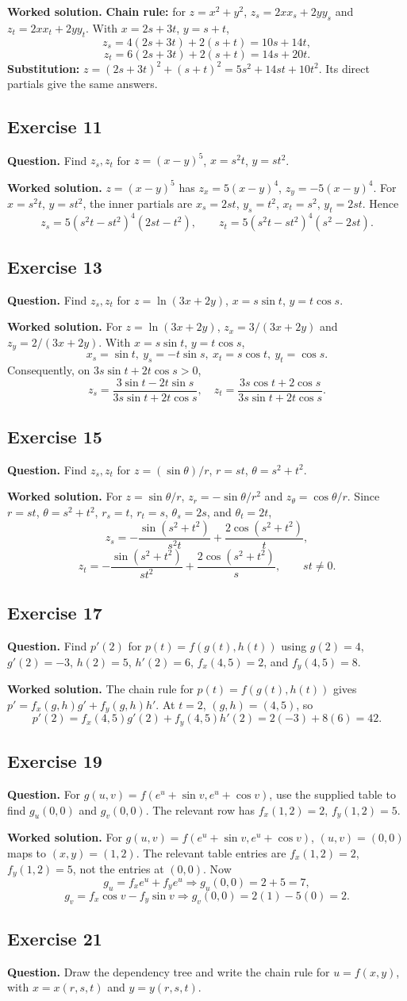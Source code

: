 \documentclass[11pt]{article}
\newcommand{\ex}[1]{\Needspace{8\baselineskip}\subsection*{Exercise #1}}
\newcommand{\ans}[1]{\boxed{#1}}
\begin{document}
\textbf{Worked solution.}
\textbf{Chain rule:} for $z=x^2+y^2$, $z_s=2xx_s+2yy_s$ and $z_t=2xx_t+2yy_t$. With $x=2s+3t$, $y=s+t$,
\[z_s=4(2s+3t)+2(s+t)=\ans{10s+14t},\]
\[z_t=6(2s+3t)+2(s+t)=\ans{14s+20t}.\]
\textbf{Substitution:} $z=(2s+3t)^2+(s+t)^2=5s^2+14st+10t^2$. Its direct partials give the same answers.
\ex{11}
\textbf{Question.} Find $z_s,z_t$ for $z=(x-y)^5$, $x=s^2t$, $y=st^2$.

\textbf{Worked solution.}
$z=(x-y)^5$ has $z_x=5(x-y)^4$, $z_y=-5(x-y)^4$. For $x=s^2t$, $y=st^2$, the inner partials are $x_s=2st$, $y_s=t^2$, $x_t=s^2$, $y_t=2st$. Hence
\[\ans{z_s=5(s^2t-st^2)^4(2st-t^2)},\qquad
\ans{z_t=5(s^2t-st^2)^4(s^2-2st)}.\]
\ex{13}
\textbf{Question.} Find $z_s,z_t$ for $z=\ln(3x+2y)$, $x=s\sin t$, $y=t\cos s$.

\textbf{Worked solution.}
For $z=\ln(3x+2y)$, $z_x=3/(3x+2y)$ and $z_y=2/(3x+2y)$. With $x=s\sin t$, $y=t\cos s$,
\[x_s=\sin t,\ y_s=-t\sin s,\ x_t=s\cos t,\ y_t=\cos s.\]
Consequently, on $3s\sin t+2t\cos s>0$,
\[\ans{z_s=\frac{3\sin t-2t\sin s}{3s\sin t+2t\cos s}},\quad
\ans{z_t=\frac{3s\cos t+2\cos s}{3s\sin t+2t\cos s}}.\]
\ex{15}
\textbf{Question.} Find $z_s,z_t$ for $z=(\sin\theta)/r$, $r=st$, $\theta=s^2+t^2$.

\textbf{Worked solution.}
For $z=\sin\theta/r$, $z_r=-\sin\theta/r^2$ and $z_\theta=\cos\theta/r$. Since $r=st$, $\theta=s^2+t^2$, $r_s=t$, $r_t=s$, $\theta_s=2s$, and $\theta_t=2t$,
\[\ans{z_s=-\frac{\sin(s^2+t^2)}{s^2t}+\frac{2\cos(s^2+t^2)}t},\]
\[\ans{z_t=-\frac{\sin(s^2+t^2)}{st^2}+\frac{2\cos(s^2+t^2)}s},\qquad st\ne0.\]
\ex{17}
\textbf{Question.} Find $p\prime(2)$ for $p(t)=f(g(t),h(t))$ using $g(2)=4$, $g\prime(2)=-3$, $h(2)=5$, $h\prime(2)=6$, $f_x(4,5)=2$, and $f_y(4,5)=8$.

\textbf{Worked solution.}
The chain rule for $p(t)=f(g(t),h(t))$ gives $p'=f_x(g,h)g'+f_y(g,h)h'$. At $t=2$, $(g,h)=(4,5)$, so
\[p'(2)=f_x(4,5)g'(2)+f_y(4,5)h'(2)=2(-3)+8(6)=\ans{42}.\]
\ex{19}
\textbf{Question.} For $g(u,v)=f(e^u+\sin v,e^u+\cos v)$, use the supplied table to find $g_u(0,0)$ and $g_v(0,0)$. The relevant row has $f_x(1,2)=2$, $f_y(1,2)=5$.

\textbf{Worked solution.}
For $g(u,v)=f(e^u+\sin v,e^u+\cos v)$, $(u,v)=(0,0)$ maps to $(x,y)=(1,2)$. The relevant table entries are $f_x(1,2)=2$, $f_y(1,2)=5$, not the entries at $(0,0)$. Now
\[g_u=f_xe^u+f_ye^u\Rightarrow\ans{g_u(0,0)=2+5=7},\]
\[g_v=f_x\cos v-f_y\sin v\Rightarrow\ans{g_v(0,0)=2(1)-5(0)=2}.\]
\ex{21}
\textbf{Question.} Draw the dependency tree and write the chain rule for $u=f(x,y)$, with $x=x(r,s,t)$ and $y=y(r,s,t)$.
\end{document}

